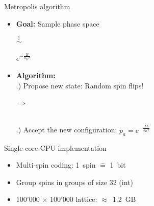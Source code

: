 \documentclass{beamer}
\begin{document}
\begin{frame}{Metropolis algorithm}
\begin{itemize}
    \item \textbf{Goal:} Sample phase space\\
        \vspace{3mm}
        \begin{minipage}[c]{0.4\textwidth}
            
        \end{minipage}
        \begin{minipage}[c]{0.2\textwidth} {\Huge $\stackrel{!}{\sim}$} \end{minipage}
        \begin{minipage}[c]{0.3\textwidth} {\Huge $e^{-\frac{E}{k_B T}}$} \end{minipage} \pause
    \item \textbf{Algorithm:}\\ .) Propose new state: Random spin flips!\\
            \vspace{2mm}
            \begin{minipage}{0.3\textwidth}
                
            \end{minipage}
            \hfill
            \begin{minipage}[c]{0.2\textwidth} {\Huge $\Rightarrow$} \end{minipage}
            \begin{minipage}[c]{0.3\textwidth}
                
            \end{minipage}\\ .) Accept the new configuration: $p_a = e^{-\frac{\Delta E}{k_B T}}$
\end{itemize}
\end{frame}

\begin{frame}{Single core CPU implementation}
\begin{itemize}
    \item Multi-spin coding: 1~spin $\mathrel{\widehat{=}}$ 1~bit \pause
    \item Group spins in groups of size 32 (int)
    \item 100'000 $\times$ 100'000 lattice: $\approx$~1.2~GB
\end{itemize}
\end{frame}
\end{document}
